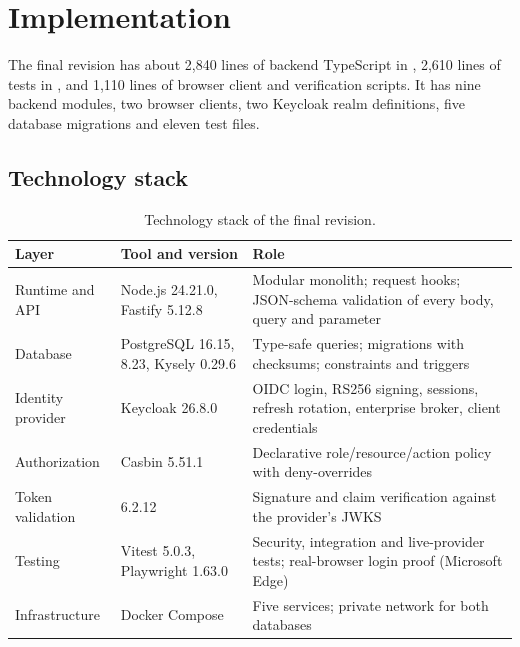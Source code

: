 \section{Implementation}
\label{sec:impl}

The final revision has about 2,840 lines of backend TypeScript in , 2,610 lines of tests in , and 1,110 lines of browser client and verification scripts. It has nine backend modules, two browser clients, two Keycloak realm definitions, five database migrations and eleven test files.

\subsection{Technology stack}
\begin{table}[H]
\centering
\small
\begin{tabularx}{\textwidth}{@{}l P{4.4cm} L@{}}
\toprule
\textbf{Layer} & \textbf{Tool and version} & \textbf{Role}\\
\midrule
Runtime and API & Node.js 24.21.0, Fastify 5.12.8 & Modular monolith; request hooks; JSON-schema validation of every body, query and parameter\\
Database & PostgreSQL 16.15,  8.23, Kysely 0.29.6 & Type-safe queries; migrations with checksums; constraints and triggers\\
Identity provider & Keycloak 26.8.0 & OIDC login, RS256 signing, sessions, refresh rotation, enterprise broker, client credentials\\
Authorization & Casbin 5.51.1 & Declarative role/resource/action policy with deny-overrides\\
Token validation &  6.2.12 & Signature and claim verification against the provider's JWKS\\
Testing & Vitest 5.0.3, Playwright 1.63.0 & Security, integration and live-provider tests; real-browser login proof (Microsoft Edge)\\
Infrastructure & Docker Compose & Five services; private network for both databases\\
\bottomrule
\end{tabularx}
\caption{Technology stack of the final revision.}
\end{table}

